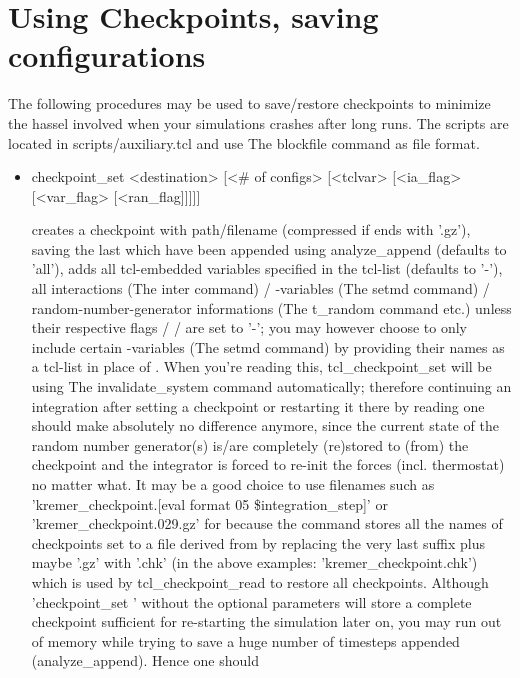 \section{Using Checkpoints, saving configurations}
The following procedures may be used to save/restore checkpoints to
minimize the hassel involved when your simulations crashes after long
runs. The scripts are located in scripts/auxiliary.tcl and use The
blockfile command as file format.
\begin{itemize}
 \item
\begin{code}
checkpoint\_set <destination> [<\# of configs> [<tclvar>
 [<ia\_flag> [<var\_flag> [<ran\_flag]]]]]
\end{code}
creates a checkpoint with path/filename  (compressed
if  ends with '.gz'), saving the last  which have been appended using analyze\_append (defaults to
'all'), adds all tcl-embedded variables specified in the tcl-list
 (defaults to '-'), all interactions (The inter command) /
\es{}-variables (The setmd command) / random-number-generator
informations (The t\_random command etc.) unless their respective
flags  /  /  are set to
'-'; you may however choose to only include certain \es{}-variables
(The setmd command) by providing their names as a tcl-list in place of
.  When you're reading this, tcl\_checkpoint\_set will
be using The invalidate\_system command automatically; therefore
continuing an integration after setting a checkpoint or restarting it
there by reading one should make absolutely no difference anymore,
since the current state of the random number generator(s) is/are
completely (re)stored to (from) the checkpoint and the integrator is
forced to re-init the forces (incl. thermostat) no matter what.  It
may be a good choice to use filenames such as
'kremer\_checkpoint.[eval format 05 \$integration\_step]' or
'kremer\_checkpoint.029.gz' for  because the command
stores all the names of checkpoints set to a file derived from
 by replacing the very last suffix plus maybe '.gz'
with '.chk' (in the above examples: 'kremer\_checkpoint.chk') which is
used by tcl\_checkpoint\_read to restore all checkpoints.  Although
'checkpoint\_set ' without the optional parameters
will store a complete checkpoint sufficient for re-starting the
simulation later on, you may run out of memory while trying to save a
huge number of timesteps appended (analyze\_append). Hence one should

\end{itemize}
